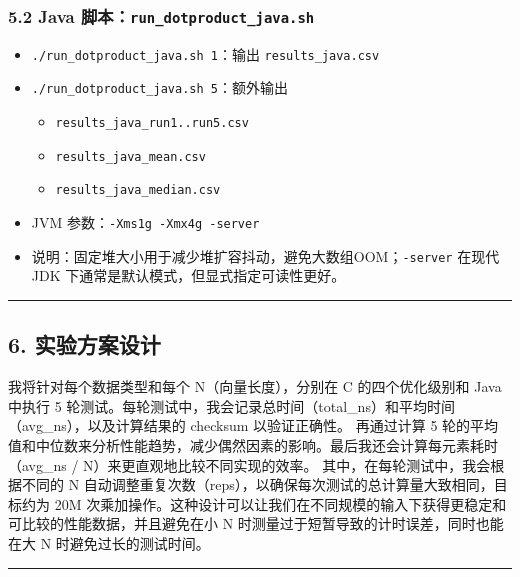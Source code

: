 \documentclass[12pt,fontset=none]{ctexart}
\providecommand{\tightlist}{%
  \setlength{\itemsep}{0pt}\setlength{\parskip}{0pt}}
\begin{document}
\subsubsection{\texorpdfstring{5.2 Java
脚本：\texttt{run\_dotproduct\_java.sh}}{5.2 Java 脚本：run\_dotproduct\_java.sh}}\label{52-java-ux811aux672crun_dotproduct_javash}

\begin{itemize}
\item
  \texttt{./run\_dotproduct\_java.sh\ 1}：输出
  \texttt{results\_java.csv}
\item
  \texttt{./run\_dotproduct\_java.sh\ 5}：额外输出

  \begin{itemize}
  \tightlist
  \item
    \texttt{results\_java\_run1..run5.csv}
  \item
    \texttt{results\_java\_mean.csv}
  \item
    \texttt{results\_java\_median.csv}
  \end{itemize}
\item
  JVM 参数：\texttt{-Xms1g\ -Xmx4g\ -server}
\item
  说明：固定堆大小用于减少堆扩容抖动，避免大数组OOM；\texttt{-server}
  在现代 JDK 下通常是默认模式，但显式指定可读性更好。
\end{itemize}

\begin{center}\rule{0.5\linewidth}{0.5pt}\end{center}

\subsection{6.
实验方案设计}\label{6-ux5b9eux9a8cux65b9ux6848ux8bbeux8ba1}

我将针对每个数据类型和每个 N（向量长度），分别在 C 的四个优化级别和 Java
中执行 5
轮测试。每轮测试中，我会记录总时间（total\_ns）和平均时间（avg\_ns），以及计算结果的
checksum 以验证正确性。 再通过计算 5
轮的平均值和中位数来分析性能趋势，减少偶然因素的影响。最后我还会计算每元素耗时（avg\_ns
/ N）来更直观地比较不同实现的效率。 其中，在每轮测试中，我会根据不同的 N
自动调整重复次数（reps），以确保每次测试的总计算量大致相同，目标约为 20M
次乘加操作。这种设计可以让我们在不同规模的输入下获得更稳定和可比较的性能数据，并且避免在小
N 时测量过于短暂导致的计时误差，同时也能在大 N 时避免过长的测试时间。

\begin{center}\rule{0.5\linewidth}{0.5pt}\end{center}
\end{document}
